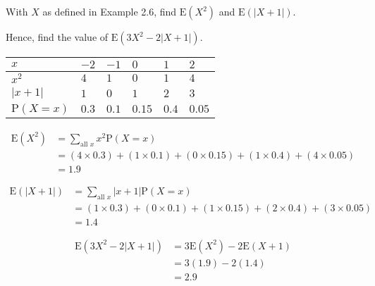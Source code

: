 \documentclass[11pt,a4paper]{book}
\begin{document}
\medskip

\begin{example}[Expectation of $g(X)$]

With $X$ as defined in \textsf{Example 2.6}, find $\text{E}\left(X^{2}\right)$
and $\text{E}\left(\left|X+1\right|\right)$.

Hence, find the value of $\text{E}\left(3X^{2}-2\left|X+1\right|\right)$.

\Solution

\begin{center}
\setlength{\extrarowheight}{2pt}%
\begin{tabular}[t]{|>{\centering}m{2cm}|>{\centering}m{1.5cm}|>{\centering}m{1.5cm}|>{\centering}m{1.5cm}|>{\centering}m{1.5cm}|>{\centering}m{1.5cm}|}
\hline
$x$ & $-2$ & $-1$ & $0$ & $1$ & $2$\tabularnewline
\hline
$x^{2}$ & $4$ & $1$ & $0$ & $1$ & $4$\tabularnewline
\hline
$\left|x+1\right|$ & $1$ & $0$ & $1$ & $2$ & $3$\tabularnewline
\hline
$\text{P}\left(X=x\right)$ & $0.3$ & $0.1$ & $0.15$ & $0.4$ & $0.05$\tabularnewline
\hline
\end{tabular}
\par\end{center}

\begin{align*}
\text{E}\left(X^{2}\right) & =\sum_{\text{all }x}x^{2}\text{P}\left(X=x\right)\\
 & =\left(4\times0.3\right)+\left(1\times0.1\right)+\left(0\times0.15\right)+\left(1\times0.4\right)+\left(4\times0.05\right)\\
 & =1.9
\end{align*}

\begin{align*}
\text{E}\left(\left|X+1\right|\right) & =\sum_{\text{all }x}\left|x+1\right|\text{P}\left(X=x\right)\\
 & =\left(1\times0.3\right)+\left(0\times0.1\right)+\left(1\times0.15\right)+\left(2\times0.4\right)+\left(3\times0.05\right)\\
 & =1.4
\end{align*}


\begin{align*}
\text{E}\left(3X^{2}-2\left|X+1\right|\right) & =3\text{E}\left(X^{2}\right)-2\text{E}\left(X+1\right)\\
 & =3\left(1.9\right)-2\left(1.4\right)\\
 & =2.9
\end{align*}
\end{example}
\end{document}
